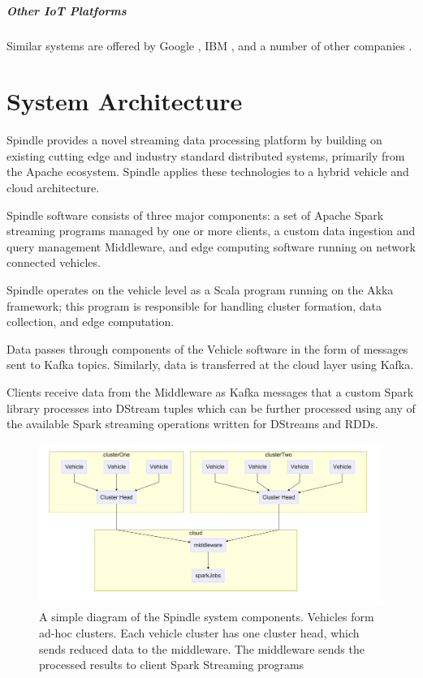 \documentclass{thesis}
\begin{document}
        \paragraph{Other IoT Platforms}
            Similar systems are offered by Google \cite{google:iot}, IBM \cite{ibm:iot}, and a number of other companies
            \cite{forbes:iot}.

\chapter{System Architecture}
    Spindle provides a novel streaming data processing platform by building on
    existing cutting edge and industry standard distributed systems, primarily
    from the Apache ecosystem. Spindle applies these technologies to a hybrid
    vehicle and cloud architecture.

    Spindle software consists of three major components: a set of Apache Spark %
    streaming programs managed by one or more clients, a custom data ingestion and
    query management Middleware, and edge computing software running on network
    connected vehicles.
    
    Spindle operates on the vehicle level as a Scala
    \cite{scala} program running on the Akka \cite{akka} framework; this program
    is responsible for handling cluster formation, data collection, and edge
    computation.

    Data passes through components of the Vehicle software in the form of 
    messages sent to Kafka \cite{kafka} topics. Similarly, data is transferred
    at the cloud layer using Kafka.

    Clients receive data from the Middleware as Kafka messages that a custom Spark \cite{spark}
    library processes into DStream tuples which can be further processed using any of the available
    Spark streaming operations written for DStreams and RDDs.

    \begin{figure}
        \centering
        \includegraphics[width=0.8\linewidth]{binImages/theoretical-simple-system.png}
        \caption{A simple diagram of the Spindle system components. Vehicles form ad-hoc clusters.
        Each vehicle cluster has one cluster head, which sends reduced data to the middleware.
        The middleware sends the processed results to client Spark Streaming programs}
    \end{figure}
\end{document}
